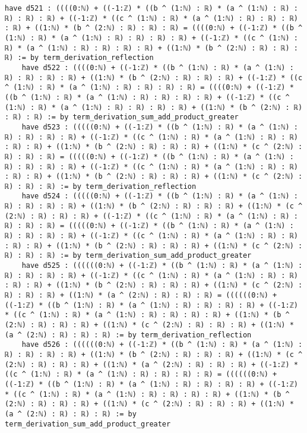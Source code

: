 \documentclass{article}
\begin{document}
\begin{tcolorbox}[colback=white!10, width=\linewidth]
\begin{lstlisting}[language=Lean4]
    have d521 : ((((0:ℕ) + ((-1:ℤ) * ((b ^ (1:ℕ) : ℝ) * (a ^ (1:ℕ) : ℝ) : ℝ) : ℝ) : ℝ) + ((-1:ℤ) * ((c ^ (1:ℕ) : ℝ) * (a ^ (1:ℕ) : ℝ) : ℝ) : ℝ) : ℝ) + ((1:ℕ) * (b ^ (2:ℕ) : ℝ) : ℝ) : ℝ) = ((((0:ℕ) + ((-1:ℤ) * ((b ^ (1:ℕ) : ℝ) * (a ^ (1:ℕ) : ℝ) : ℝ) : ℝ) : ℝ) + ((-1:ℤ) * ((c ^ (1:ℕ) : ℝ) * (a ^ (1:ℕ) : ℝ) : ℝ) : ℝ) : ℝ) + ((1:ℕ) * (b ^ (2:ℕ) : ℝ) : ℝ) : ℝ) := by term_derivation_reflection
    have d522 : ((((0:ℕ) + ((-1:ℤ) * ((b ^ (1:ℕ) : ℝ) * (a ^ (1:ℕ) : ℝ) : ℝ) : ℝ) : ℝ) + ((1:ℕ) * (b ^ (2:ℕ) : ℝ) : ℝ) : ℝ) + ((-1:ℤ) * ((c ^ (1:ℕ) : ℝ) * (a ^ (1:ℕ) : ℝ) : ℝ) : ℝ) : ℝ) = ((((0:ℕ) + ((-1:ℤ) * ((b ^ (1:ℕ) : ℝ) * (a ^ (1:ℕ) : ℝ) : ℝ) : ℝ) : ℝ) + ((-1:ℤ) * ((c ^ (1:ℕ) : ℝ) * (a ^ (1:ℕ) : ℝ) : ℝ) : ℝ) : ℝ) + ((1:ℕ) * (b ^ (2:ℕ) : ℝ) : ℝ) : ℝ) := by term_derivation_sum_add_product_greater
    have d523 : (((((0:ℕ) + ((-1:ℤ) * ((b ^ (1:ℕ) : ℝ) * (a ^ (1:ℕ) : ℝ) : ℝ) : ℝ) : ℝ) + ((-1:ℤ) * ((c ^ (1:ℕ) : ℝ) * (a ^ (1:ℕ) : ℝ) : ℝ) : ℝ) : ℝ) + ((1:ℕ) * (b ^ (2:ℕ) : ℝ) : ℝ) : ℝ) + ((1:ℕ) * (c ^ (2:ℕ) : ℝ) : ℝ) : ℝ) = (((((0:ℕ) + ((-1:ℤ) * ((b ^ (1:ℕ) : ℝ) * (a ^ (1:ℕ) : ℝ) : ℝ) : ℝ) : ℝ) + ((-1:ℤ) * ((c ^ (1:ℕ) : ℝ) * (a ^ (1:ℕ) : ℝ) : ℝ) : ℝ) : ℝ) + ((1:ℕ) * (b ^ (2:ℕ) : ℝ) : ℝ) : ℝ) + ((1:ℕ) * (c ^ (2:ℕ) : ℝ) : ℝ) : ℝ) := by term_derivation_reflection
    have d524 : (((((0:ℕ) + ((-1:ℤ) * ((b ^ (1:ℕ) : ℝ) * (a ^ (1:ℕ) : ℝ) : ℝ) : ℝ) : ℝ) + ((1:ℕ) * (b ^ (2:ℕ) : ℝ) : ℝ) : ℝ) + ((1:ℕ) * (c ^ (2:ℕ) : ℝ) : ℝ) : ℝ) + ((-1:ℤ) * ((c ^ (1:ℕ) : ℝ) * (a ^ (1:ℕ) : ℝ) : ℝ) : ℝ) : ℝ) = (((((0:ℕ) + ((-1:ℤ) * ((b ^ (1:ℕ) : ℝ) * (a ^ (1:ℕ) : ℝ) : ℝ) : ℝ) : ℝ) + ((-1:ℤ) * ((c ^ (1:ℕ) : ℝ) * (a ^ (1:ℕ) : ℝ) : ℝ) : ℝ) : ℝ) + ((1:ℕ) * (b ^ (2:ℕ) : ℝ) : ℝ) : ℝ) + ((1:ℕ) * (c ^ (2:ℕ) : ℝ) : ℝ) : ℝ) := by term_derivation_sum_add_product_greater
    have d525 : ((((((0:ℕ) + ((-1:ℤ) * ((b ^ (1:ℕ) : ℝ) * (a ^ (1:ℕ) : ℝ) : ℝ) : ℝ) : ℝ) + ((-1:ℤ) * ((c ^ (1:ℕ) : ℝ) * (a ^ (1:ℕ) : ℝ) : ℝ) : ℝ) : ℝ) + ((1:ℕ) * (b ^ (2:ℕ) : ℝ) : ℝ) : ℝ) + ((1:ℕ) * (c ^ (2:ℕ) : ℝ) : ℝ) : ℝ) + ((1:ℕ) * (a ^ (2:ℕ) : ℝ) : ℝ) : ℝ) = ((((((0:ℕ) + ((-1:ℤ) * ((b ^ (1:ℕ) : ℝ) * (a ^ (1:ℕ) : ℝ) : ℝ) : ℝ) : ℝ) + ((-1:ℤ) * ((c ^ (1:ℕ) : ℝ) * (a ^ (1:ℕ) : ℝ) : ℝ) : ℝ) : ℝ) + ((1:ℕ) * (b ^ (2:ℕ) : ℝ) : ℝ) : ℝ) + ((1:ℕ) * (c ^ (2:ℕ) : ℝ) : ℝ) : ℝ) + ((1:ℕ) * (a ^ (2:ℕ) : ℝ) : ℝ) : ℝ) := by term_derivation_reflection
    have d526 : ((((((0:ℕ) + ((-1:ℤ) * ((b ^ (1:ℕ) : ℝ) * (a ^ (1:ℕ) : ℝ) : ℝ) : ℝ) : ℝ) + ((1:ℕ) * (b ^ (2:ℕ) : ℝ) : ℝ) : ℝ) + ((1:ℕ) * (c ^ (2:ℕ) : ℝ) : ℝ) : ℝ) + ((1:ℕ) * (a ^ (2:ℕ) : ℝ) : ℝ) : ℝ) + ((-1:ℤ) * ((c ^ (1:ℕ) : ℝ) * (a ^ (1:ℕ) : ℝ) : ℝ) : ℝ) : ℝ) = ((((((0:ℕ) + ((-1:ℤ) * ((b ^ (1:ℕ) : ℝ) * (a ^ (1:ℕ) : ℝ) : ℝ) : ℝ) : ℝ) + ((-1:ℤ) * ((c ^ (1:ℕ) : ℝ) * (a ^ (1:ℕ) : ℝ) : ℝ) : ℝ) : ℝ) + ((1:ℕ) * (b ^ (2:ℕ) : ℝ) : ℝ) : ℝ) + ((1:ℕ) * (c ^ (2:ℕ) : ℝ) : ℝ) : ℝ) + ((1:ℕ) * (a ^ (2:ℕ) : ℝ) : ℝ) : ℝ) := by term_derivation_sum_add_product_greater

\end{lstlisting}
\end{tcolorbox}
\end{document}
